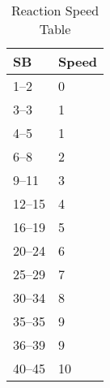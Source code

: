 \begin{table}[h] \label{Table:Speed}
	\begin{tabular}{ll}
	SB 		& Speed \\
	\hline
	1--2	& 0		   \\
	3--3	& 1		   \\
	4--5	& 1		   \\
	6--8	& 2		   \\
	9--11	& 3		   \\
	12--15  & 4		   \\
	16--19  & 5		   \\
	20--24  & 6		   \\
	25--29  & 7		   \\
	30--34  & 8		   \\
	35--35  & 9		   \\
	36--39  & 9		   \\ 
	40--45  & 10	   \\ 
    \end{tabular}
    \caption{Reaction Speed Table}
\end{table}
